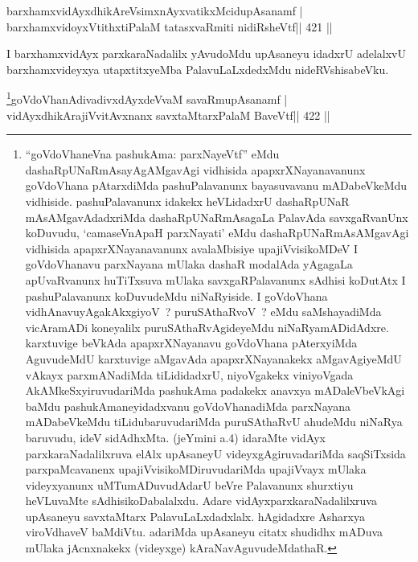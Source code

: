 
\begin{shl}
barxhamxvidAyxdhikAreV\s simxnAyxvatikxMcidupAsanamf |
barxhamxvidoyxVtithxtiPalaM tatasxvaRmiti nidiRsheVtf\hfill || 421 ||
\end{shl}

\begin{artha}
I barxhamxvidAyx parxkaraNadalilx yAvudoMdu upAsaneyu idadxrU adelalxvU barxhamxvideyxya utapxtitxyeMba PalavuLaLxdedxMdu nideRVshisabeVku.
\end{artha}



\begin{shl}
\footnote{``goVdoVhaneVna pashukAma: parxNayeVtf'' eMdu dashaRpUNaRmAsayAgAMgavAgi vidhisida apapxrXNayanavanunx goVdoVhana pAtarxdiMda pashuPalavanunx bayasuvavanu mADabeVkeMdu vidhiside. pashuPalavanunx idakekx heVLidadxrU dashaRpUNaR mAsAMgavAdadxriMda dashaRpUNaRmAsagaLa PalavAda savxgaRvanUnx koDuvudu, `camaseVnApaH parxNayati' eMdu dashaRpUNaRmAsAMgavAgi vidhisida apapxrXNayanavanunx avalaMbisiye upajiVvisikoMDeV I goVdoVhanavu parxNayana mUlaka dashaR modalAda yAgagaLa apUvaRvanunx huTiTxsuva mUlaka savxgaRPalavanunx sAdhisi koDutAtx I pashuPalavanunx koDuvudeMdu niNaRyiside. I goVdoVhana vidhAnavu\break yAgakAkxgiyoV~? puruSAthaRvoV~? eMdu saMshayadiMda vicAramADi koneyalilx puruSAthaRvAgideyeMdu niNaRyamADidAdxre. karxtuvige beVkAda apapxrXNayanavu goVdoVhana pAterxyiMda AguvudeMdU karxtuvige aMgavAda apapxrXNayanakekx aMgavAgiyeMdU vAkayx parxmANadiMda tiLididadxrU, niyoVgakekx viniyoVgada AkAMkeSxyiruvudariMda pashukAma padakekx anavxya mADaleVbeVkAgi baMdu pashukAmaneyidadxvanu goVdoVhanadiMda parxNayana mADabeVkeMdu tiLidubaruvudariMda puruSAthaRvU ahudeMdu niNaRya baruvudu, ideV sidAdhxMta. (jeYmini a.4) idaraMte vidAyx parxkaraNadalilxruva elAlx upAsaneyU videyxgAgiruvadariMda saqSiTxsida parxpaMcavanenx upajiVvisikoMDiruvudariMda upajiVvayx mUlaka videyxyanunx uMTumADuvudAdarU beVre Palavanunx shurxtiyu heVLuvaMte sAdhisikoDabalalxdu. Adare vidAyxparxkaraNadalilxruva upAsaneyu savxtaMtarx PalavuLaLxdadxlalx. hAgidadxre Asharxya viroVdhaveV baMdiVtu. adariMda upAsaneyu citatx shudidhx mADuva mUlaka jAcnxnakekx (videyxge) kAraNavAguvudeMdathaR.}goVdoVhanAdivadivxdAyxdeVvaM savaRmupAsanamf |
vidAyxdhikArajiVvitAvxnanx savxtaMtarxPalaM BaveVtf\hfill || 422 ||
\end{shl}

